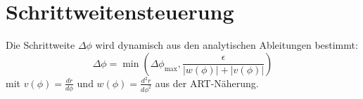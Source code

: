 \section{Schrittweitensteuerung}
Die Schrittweite \( \Delta \phi \) wird dynamisch aus den analytischen Ableitungen bestimmt:
\[
\Delta \phi = \min \left( \Delta \phi_{\text{max}}, \frac{\epsilon}{|w(\phi)| + |v(\phi)|} \right)
\]
mit \( v(\phi) = \frac{dr}{d\phi} \) und \( w(\phi) = \frac{d^2r}{d\phi^2} \) aus der ART-Näherung.
